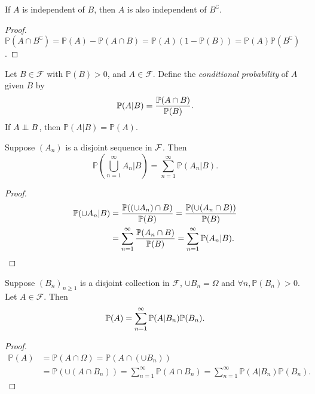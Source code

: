 \begin{claim}
    If $A$ is independent of $B$, then $A$ is also independent of $ B^\complement $.
\end{claim}
\begin{proof}
    $ \mathbb{P}(A\cap B^\complement)=\mathbb{P}(A)-\mathbb{P}(A \cap B)  =\mathbb{P}(A)(1-\mathbb{P}(B))=\mathbb{P}(A)\mathbb{P}(B^\complement) $.
\end{proof}

\begin{definition}
    Let $ B\in \mathscr{F} $ with $ \mathbb{P}(B)>0 $, and $ A\in \mathscr{F} $. Define the \textit{conditional probability} of $A$ given $B$ by 
    \[
        \mathbb{P}(A|B)=\frac{{\mathbb{P}}(A\cap B)}{{\mathbb{P}}(B)}.
    \]
    If $ A \independent B $, then $ \mathbb{P}(A|B)=\mathbb{P}(A) $.
\end{definition}

\begin{proposition}\label{prop:Countable additivity for conditional probability}
    Suppose $ (A_n) $ is a disjoint sequence in $ {\mathcal{F}} $. Then 
    \[
        \mathbb{P}\left( \bigcup_{n=1}^{\infty}A_n\Big|B \right) = \sum_{n=1}^{\infty}\mathbb{P}(A_n|B).
    \]
\end{proposition}
\begin{proof}
    \begin{align*}
        \mathbb{P}(\cup A_n|B) &= \frac{\mathbb{P}((\cup A_n)\cap B)}{{\mathbb{P}}(B)} = \frac{{\mathbb{P}}(\cup(A_n\cap B))}{\mathbb{P}(B)}\\ 
        &=\sum_{n=1}^{\infty}\frac{{\mathbb{P}}(A_n\cap B)}{\mathbb{P}(B)}=\sum_{n=1}^{\infty}\mathbb{P}(A_n|B).
    \end{align*}
\end{proof}

\begin{proposition}\label{prop:Law of total probability}
    Suppose $ (B_n)_{n\ge 1} $ is a disjoint collection in $ \mathscr{F} $, $ \cup B_n=\Omega $ and $ \forall n, \mathbb{P}(B_n)>0 $. Let $ A\in \mathscr{F} $. Then 
    \[
        {\mathbb{P}}(A)=\sum_{n=1}^{\infty}\mathbb{P}(A|B_n)\mathbb{P}(B_n).
    \]
\end{proposition}
\begin{proof}
    \begin{align*}
        \mathbb{P}(A)&= \mathbb{P}(A\cap \Omega) = \mathbb{P}(A\cap (\cup B_n))\\ 
        &= \mathbb{P}(\cup (A\cap B_n)) = \sum_{n=1}^{\infty} \mathbb{P}(A\cap B_n)=\sum_{n=1}^{\infty}\mathbb{P}(A|B_n)\mathbb{P}(B_n).
    \end{align*}
\end{proof}

